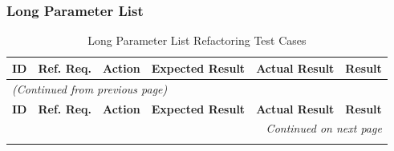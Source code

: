 \documentclass[12pt, titlepage]{article}
\begin{document}
\subsubsection{Long Parameter List}

\begin{longtable}{c 
  >{\raggedright\arraybackslash}p{1.5cm} 
  >{\raggedright\arraybackslash}p{4.5cm} 
  >{\raggedright\arraybackslash}p{4cm} 
  >{\raggedright\arraybackslash}p{3cm} c}
  \toprule
  \textbf{ID} & \textbf{Ref. Req.} & \textbf{Action} & \textbf{Expected Result} & \textbf{Actual Result} & \textbf{Result} \\ 
  \midrule
  \endfirsthead

  \multicolumn{6}{l}{\textit{(Continued from previous page)}} \\ 
  \toprule
  \textbf{ID} & \textbf{Ref. Req.} & \textbf{Action} & \textbf{Expected Result} & \textbf{Actual Result} & \textbf{Result} \\ 
  \midrule
  \endhead

  \multicolumn{6}{r}{\textit{Continued on next page}} \\
  \endfoot

  \bottomrule
  \caption{Long Parameter List Refactoring Test Cases}
  \label{table:long_parameter_list_tests}
  \endlastfoot


\end{longtable}
\end{document}
